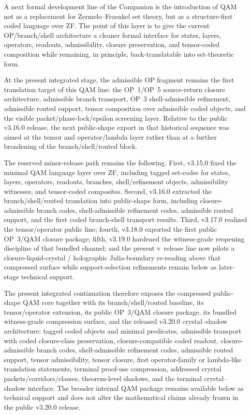\begin{remark}
A next formal development line of the Companion is the introduction of QAM not as a replacement for Zermelo--Fraenkel set theory, but as a structure-first coded language over ZF. The point of this layer is to give the current OP/branch/shell architecture a cleaner formal interface for states, layers, operators, readouts, admissibility, closure preservation, and tensor-coded composition while remaining, in principle, back-translatable into set-theoretic form.

At the present integrated stage, the admissible OP fragment remains the first translation target of this QAM line: the OP~1/OP~5 source-return closure architecture, admissible branch transport, OP~3 shell-admissible refinement, admissible routed support, tensor composition over admissible coded objects, and the visible packet/phase-lock/epsilon screening layer. Relative to the public v3.16.0 release, the next public-shape export in that historical sequence was aimed at the tensor and operator/lambda layer rather than at a further broadening of the branch/shell/routed block.

The reserved minor-release path remains the following. First, v3.15.0 fixed the minimal QAM language layer over ZF, including tagged set-codes for states, layers, operators, readouts, branches, shell/refinement objects, admissibility witnesses, and tensor-coded composites. Second, v3.16.0 extracted the branch/shell/routed translation into public-shape form, including closure-admissible branch codes, shell-admissible refinement codes, admissible routed support, and the first coded branch-shell transport results. Third, v3.17.0 realized the tensor/operator public line; fourth, v3.18.0 exported the first public OP~3/QAM closure package; fifth, v3.19.0 hardened the witness-grade reopening discipline of that bundled channel; and the present v\docversion\ release line now pilots a closure-liquid-crystal / holographic Julia-boundary re-reading above that compressed surface while support-selection refinements remain below as later-stage technical support.

The present integrated continuation therefore exposes the compressed public-shape QAM core together with its branch/shell/routed baseline, its tensor/operator extension, its public OP~3/QAM closure package, its bundled witness-grade compression surface, and the released v3.20.0 crystal--shadow architecture: tagged coded objects and minimal predicates, admissible transport with coded closure-class preservation, closure-compatible coded readout, closure-admissible branch codes, shell-admissible refinement codes, admissible routed support, tensor admissibility, tensor closure, first operator-family or lambda-like translation statements, terminal proof-use compression, addressed crystal packets/corridors/classes, theorem-level shadows, and the terminal crystal--shadow interface. The broader internal QAM package remains available below as technical support and does not alter the mathematical claims already frozen in the public v3.20.0 release.


\end{remark}
